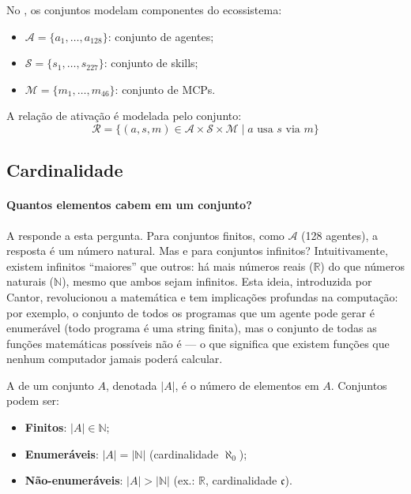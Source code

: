 \begin{exemplo}
    No \opencodeeco, os conjuntos modelam componentes do ecossistema:
    \begin{itemize}
        \item $\mathcal{A} = \{a_1, \ldots, a_{128}\}$: conjunto de agentes;
        \item $\mathcal{S} = \{s_1, \ldots, s_{227}\}$: conjunto de skills;
        \item $\mathcal{M} = \{m_1, \ldots, m_{46}\}$: conjunto de MCPs.
    \end{itemize}
    A relação de ativação é modelada pelo conjunto:
    \[
    \mathcal{R} = \{(a, s, m) \in \mathcal{A} \times \mathcal{S} \times
    \mathcal{M} \mid a \text{ usa } s \text{ via } m\}
    \]
\end{exemplo}

\subsection{Cardinalidade}

\paragraph{Quantos elementos cabem em um conjunto?} A 
responde a esta pergunta. Para conjuntos finitos, como $\mathcal{A}$ (128
agentes), a resposta é um número natural. Mas e para conjuntos infinitos?
Intuitivamente, existem infinitos ``maiores'' que outros: há mais números
reais ($\mathbb{R}$) do que números naturais ($\mathbb{N}$), mesmo que ambos
sejam infinitos. Esta ideia, introduzida por Cantor, revolucionou a
matemática e tem implicações profundas na computação: por exemplo, o conjunto
de todos os programas que um agente pode gerar é enumerável (todo programa é
uma string finita), mas o conjunto de todas as funções matemáticas possíveis
não é --- o que significa que existem funções que nenhum computador jamais
poderá calcular.

\begin{definicao}[Cardinalidade]
    A  de um conjunto $A$, denotada $|A|$, é o
    número de elementos em $A$. Conjuntos podem ser:
    \begin{itemize}
        \item \textbf{Finitos}: $|A| \in \mathbb{N}$;
        \item \textbf{Enumeráveis}: $|A| = |\mathbb{N}|$ (cardinalidade
              $\aleph_0$);
        \item \textbf{Não-enumeráveis}: $|A| > |\mathbb{N}|$ (ex.:
              $\mathbb{R}$, cardinalidade $\mathfrak{c}$).
    \end{itemize}
\end{definicao}

